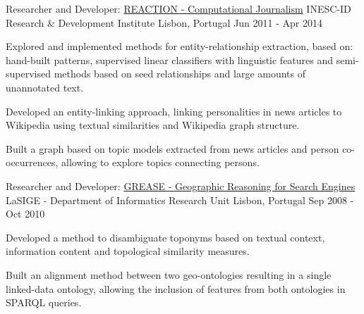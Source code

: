 \begin{cventries}
  \cventry
    {Researcher and Developer: \href{http://arquivo.pt/wayback/20151118124735/http://dmir.inesc-id.pt/project/Reaction}{REACTION - Computational Journalism}} %
    {INESC-ID Research \& Development Institute} %
    {Lisbon, Portugal} %
    {Jun 2011 - Apr 2014} %
    {
      \begin{cvitems} %
        \item {Explored and implemented methods for entity-relationship extraction, based on: hand-built patterns, supervised linear classifiers with linguistic features and semi-supervised methods based on seed relationships and large amounts of unannotated text.}
        \item {Developed an entity-linking approach, linking personalities in news articles to Wikipedia using textual similarities and Wikipedia graph structure.}
        \item {Built a graph based on topic models extracted from news articles and person co-occurrences, allowing to explore topics connecting persons.}
      \end{cvitems}
    }


  \cventry
    {Researcher and Developer: \href{https://arquivo.pt/wayback/20181014115718/http://xldb.di.fc.ul.pt/wiki/Grease}{GREASE - Geographic Reasoning for Search Engines}} %
    {LaSIGE - Department of Informatics Research Unit } %
    {Lisbon, Portugal} %
    {Sep 2008 - Oct 2010} %
    {
      \begin{cvitems} %
        \item {Developed a method to disambiguate toponyms based on textual context, information content and topological similarity measures.}
        \item {Built an alignment method between two geo-ontologies resulting in a single linked-data ontology, allowing the inclusion of features from both ontologies in SPARQL queries.}
      \end{cvitems}
    }


\end{cventries}
